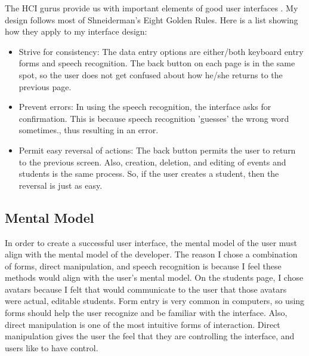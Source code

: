 \documentclass{article}
\begin{document}
The HCI gurus provide us with important elements of good user interfaces \cite{principles}.  My design follows most of Shneiderman's Eight Golden Rules.  Here is a list showing how they apply to my interface design:

\begin{itemize}
\item Strive for consistency:  The data entry options are either/both keyboard entry forms and speech recognition.  The back button on each page is in the same spot, so the user does not get confused about how he/she returns to the previous page.
\item Prevent errors: In using the speech recognition, the interface asks for confirmation.  This is because speech recognition 'guesses' the wrong word sometimes., thus resulting in an error.
\item Permit easy reversal of actions: The back button permits the user to return to the previous screen.  Also, creation, deletion, and editing of events and students is the same process.  So, if the user creates a student, then the reversal is just as easy.
\end{itemize}

\subsection{Mental Model}

In order to create a successful user interface, the mental model of the user must align with the mental model of the developer.  The reason I chose a combination of forms, direct manipulation, and speech recognition is because I feel these methods would align with the user's mental model.  On the students page, I chose avatars because I felt that would communicate to the user that those avatars were actual, editable students.  Form entry is very common in computers, so using forms should help the user recognize and be familiar with the interface.  Also, direct manipulation is one of the most intuitive forms of interaction.  Direct manipulation gives the user the feel that they are controlling the interface, and users like to have control.








\end{document}
